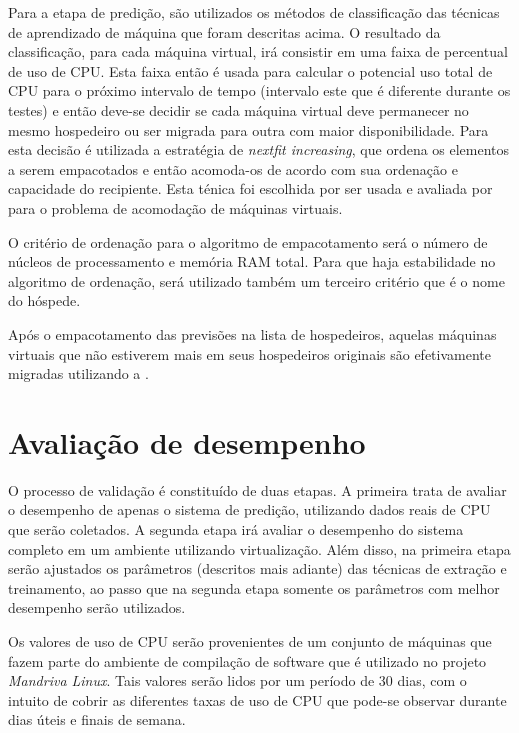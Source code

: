 Para a etapa de predição, são utilizados os métodos de classificação das
técnicas de aprendizado de máquina que foram descritas acima. O resultado da
classificação, para cada máquina virtual, irá consistir em uma faixa de
percentual de uso de CPU. Esta faixa então é usada para calcular o potencial
uso total de CPU para o próximo intervalo de tempo (intervalo este que é
diferente durante os testes) e então deve-se decidir se cada máquina virtual
deve permanecer no mesmo hospedeiro ou ser migrada para outra com maior
disponibilidade. Para esta decisão é utilizada a estratégia de \emph{next\-fit
increasing}\cite{kou1977multidimensional}, que ordena os elementos a serem
empacotados e então acomoda-os de acordo com sua ordenação e capacidade do
recipiente. Esta ténica foi escolhida por ser usada e avaliada por
 para o problema de acomodação de máquinas
virtuais.

O critério de ordenação para o algoritmo de empacotamento será o número de
núcleos de processamento e memória RAM total. Para que haja estabilidade no
algoritmo de ordenação, será utilizado também um terceiro critério que é o nome
do hóspede.

Após o empacotamento das previsões na lista de hospedeiros, aquelas
máquinas virtuais que não estiverem mais em seus hospedeiros originais
são efetivamente migradas utilizando a \libvirt{}.

\section{Avaliação de desempenho}\label{sec:desemp}


O processo de validação é constituído de duas etapas. A primeira trata de
avaliar o desempenho de apenas o sistema de predição, utilizando dados reais de
CPU que serão coletados. A segunda etapa irá avaliar o desempenho do sistema
completo em um ambiente utilizando virtualização. Além disso, na primeira etapa
serão ajustados os parâmetros (descritos mais adiante) das técnicas de extração
e treinamento, ao passo que na segunda etapa somente os parâmetros com melhor
desempenho serão utilizados.

Os valores de uso de CPU serão provenientes de um conjunto de máquinas que
fazem parte do ambiente de compilação de software que é utilizado no projeto
\emph{Mandriva Linux}. Tais valores serão lidos por um período de 30 dias, com
o intuito de cobrir as diferentes taxas de uso de CPU que pode-se observar
durante dias úteis e finais de semana.


